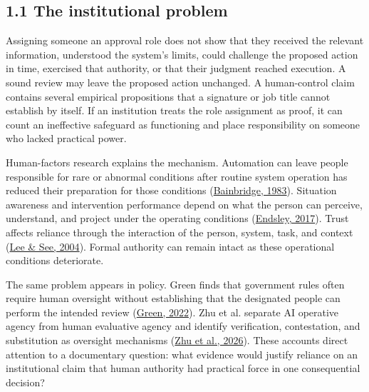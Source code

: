 \documentclass[11pt]{article}
\begin{document}
\subsection*{1.1 The institutional problem}

Assigning someone an approval role does not show that they received the relevant information, understood the system's limits, could challenge the proposed action in time, exercised that authority, or that their judgment reached execution. A sound review may leave the proposed action unchanged. A human-control claim contains several empirical propositions that a signature or job title cannot establish by itself. If an institution treats the role assignment as proof, it can count an ineffective safeguard as functioning and place responsibility on someone who lacked practical power.

Human-factors research explains the mechanism. Automation can leave people responsible for rare or abnormal conditions after routine system operation has reduced their preparation for those conditions (\href{https://doi.org/10.1016/0005-1098(83)90046-8}{Bainbridge, 1983}). Situation awareness and intervention performance depend on what the person can perceive, understand, and project under the operating conditions (\href{https://doi.org/10.1177/0018720816681350}{Endsley, 2017}). Trust affects reliance through the interaction of the person, system, task, and context (\href{https://doi.org/10.1518/hfes.46.1.50_30392}{Lee \& See, 2004}). Formal authority can remain intact as these operational conditions deteriorate.

The same problem appears in policy. Green finds that government rules often require human oversight without establishing that the designated people can perform the intended review (\href{https://doi.org/10.1016/j.clsr.2022.105681}{Green, 2022}). Zhu et al. separate AI operative agency from human evaluative agency and identify verification, contestation, and substitution as oversight mechanisms (\href{https://doi.org/10.1007/s43681-026-01147-7}{Zhu et al., 2026}). These accounts direct attention to a documentary question: what evidence would justify reliance on an institutional claim that human authority had practical force in one consequential decision?

\end{document}
